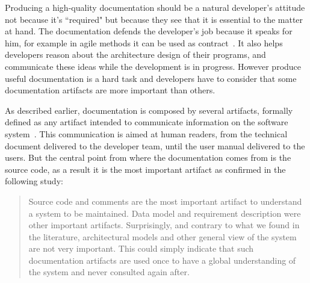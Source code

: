 Producing a high-quality documentation should be a natural developer's attitude not because it's ``required" but because they see that it is essential to the matter at hand. The documentation defends the developer's job because it speaks for him, for example in agile methods it can be used as contract~\citep{ambler2007agile}. It also helps developers reason about the architecture design of their programs, and communicate these ideas while the development is in progress. However produce useful documentation is a hard task and developers have to consider that some documentation artifacts are more important than others.

As described earlier, documentation is composed by several artifacts, formally defined as any artifact intended to communicate information on the software system~\citep{forward2002relevance}. This communication is aimed at human readers, from the technical document delivered to the developer team, until the user manual delivered to the users. But the central point from where the documentation comes from is the source code, as a result it is the most important artifact as confirmed in the following study:

\blockquote{Source code and comments are the most important artifact to understand a system to be maintained. Data model and requirement description were other important artifacts. Surprisingly, and contrary to what we found in the literature, architectural models and
other general view of the system are not very important. This could simply indicate that such documentation artifacts are used once to have a global understanding of the system and never consulted again after.~\citep[p. 74]{de2005study}}

